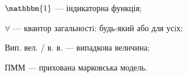$\mathbbm{1}$ --- індикаторна функція;

$\forall$ --- квантор загальностi: будь-який або для усiх;

Вип. вел. / в. в. --- випадкова величина;

ПММ --- прихована марковська модель.